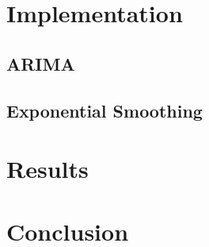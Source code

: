 \documentclass{article}
\begin{document}
  \section{Implementation}
  \subsection{ARIMA}
  \subsection{Exponential Smoothing}

  \section{Results}

  \section{Conclusion}

  \newpage
\end{document}
